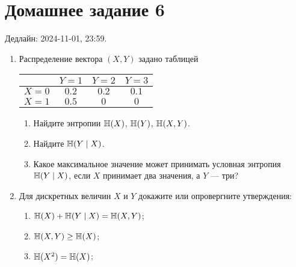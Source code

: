 \section*{Домашнее задание 6}


Дедлайн: 2024-11-01, 23:59.

\begin{enumerate}

\item Распределение вектора $(X, Y)$ задано таблицей

\begin{center}
    \begin{tabular}{lccc}
        \toprule
            & $Y = 1$  & $Y = 2$  & $Y = 3$ \\
        \midrule
        $X = 0$ & $0.2$  & $0.2$  & $0.1$ \\
        $X = 1$ & $0.5$  &  $0$   & $0$ \\
        \bottomrule
    \end{tabular}
\end{center}

\begin{enumerate}
    \item Найдите энтропии $\operatorname{\mathbb{H}}(X)$, $\operatorname{\mathbb{H}}(Y)$, $\operatorname{\mathbb{H}}(X, Y)$.
    \item Найдите $\operatorname{\mathbb{H}}(Y \mid X)$.
    \item Какое максимальное значение может принимать условная энтропия $\operatorname{\mathbb{H}}(Y \mid X)$, 
    если $X$ принимает два значения, а $Y$ — три?
\end{enumerate}


\item Для дискретных величин $X$ и $Y$ докажите или опровергните утверждения:
\begin{enumerate}
\item $\operatorname{\mathbb{H}}(X) + \operatorname{\mathbb{H}}(Y \mid X) = \operatorname{\mathbb{H}}(X, Y)$;
\item $\operatorname{\mathbb{H}}(X, Y) \geq \operatorname{\mathbb{H}}(X)$;
\item $\operatorname{\mathbb{H}}(X^2) = \operatorname{\mathbb{H}}(X)$;
\end{enumerate}


\end{enumerate}
